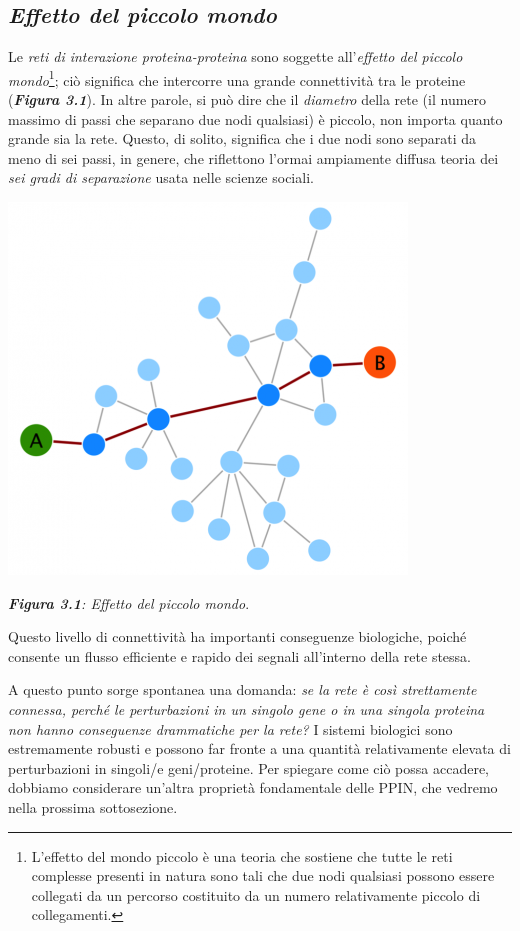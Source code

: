 \documentclass[11pt]{article}
\begin{document}
\subsection{\textit{Effetto del piccolo mondo}}
Le \textit{reti di interazione proteina-proteina} sono soggette all'\textit{effetto del piccolo mondo}\footnote{L'effetto del mondo piccolo è una teoria che sostiene che tutte le reti complesse presenti in natura sono tali che due nodi qualsiasi possono essere collegati da un percorso costituito da un numero relativamente piccolo di collegamenti.}; ciò significa che intercorre una grande connettività tra le proteine (\textit{\textbf{Figura 3.1}}). In altre parole, si può dire che il \textit{diametro} della rete (il numero massimo di passi che separano due nodi qualsiasi) è piccolo, non importa quanto grande sia la rete. Questo, di solito, significa che i due nodi sono separati da meno di sei passi, in genere, che riflettono l'ormai ampiamente diffusa teoria dei \textit{sei gradi di separazione} usata nelle scienze sociali.

\begin{center}
\includegraphics[scale=0.5]{grafo}

\begin{small}\textit{\textbf{Figura 3.1}: Effetto del piccolo mondo}.\end{small}
\end{center}

Questo livello di connettività ha importanti conseguenze biologiche, poiché consente un flusso efficiente e rapido dei segnali all'interno della rete stessa. 

A questo punto sorge spontanea una domanda: \textit{se la rete è così strettamente connessa, perché le perturbazioni in un singolo gene o in una singola proteina non hanno conseguenze drammatiche per la rete?} I sistemi biologici sono estremamente robusti e possono far fronte a una quantità relativamente elevata di perturbazioni in singoli/e geni/proteine. Per spiegare come ciò possa accadere, dobbiamo considerare un'altra proprietà fondamentale delle PPIN, che vedremo nella prossima sottosezione.
\end{document}
